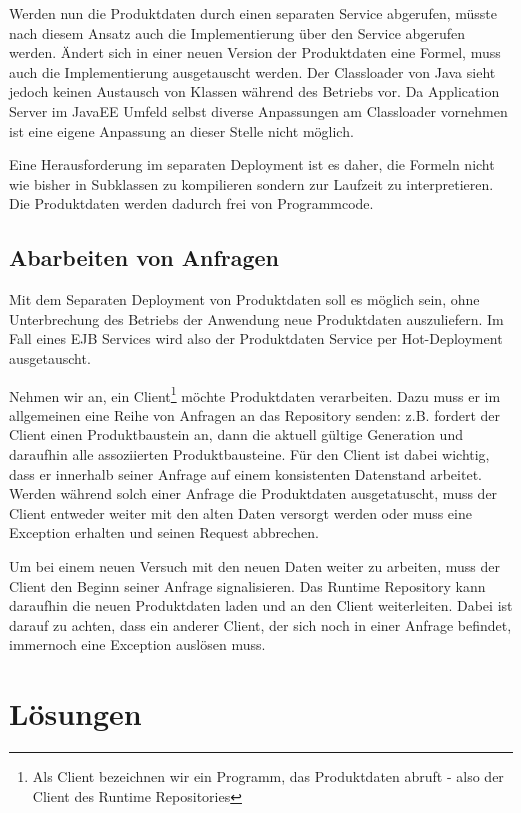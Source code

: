 \documentclass[headsepline=true, footsepline=true]{scrartcl}
\begin{document}
Werden nun die Produktdaten durch einen separaten Service abgerufen, müsste nach
diesem Ansatz auch die Implementierung über den Service abgerufen werden. Ändert
sich in einer neuen Version der Produktdaten eine Formel, muss auch die
Implementierung ausgetauscht werden. Der Classloader von Java sieht jedoch keinen
Austausch von Klassen während des Betriebs vor. Da Application Server im JavaEE
Umfeld selbst diverse Anpassungen am Classloader vornehmen ist eine eigene
Anpassung an dieser Stelle nicht möglich.

Eine Herausforderung im separaten Deployment ist es daher, die Formeln nicht wie
bisher in Subklassen zu kompilieren sondern zur Laufzeit zu interpretieren. Die
Produktdaten werden dadurch frei von Programmcode.

\subsection{Abarbeiten von Anfragen}
\label{requests}

Mit dem Separaten Deployment von Produktdaten soll es möglich sein, ohne
Unterbrechung des Betriebs der Anwendung neue Produktdaten auszuliefern. Im Fall
eines EJB Services wird also der Produktdaten Service per Hot-Deployment
ausgetauscht.

Nehmen wir an, ein Client\footnote{Als Client bezeichnen wir ein Programm, das
Produktdaten abruft - also der Client des Runtime Repositories} möchte
Produktdaten verarbeiten. Dazu muss er im allgemeinen eine Reihe von Anfragen an
das Repository senden: z.B. fordert der Client einen Produktbaustein an, dann die
aktuell gültige Generation und daraufhin alle assoziierten Produktbausteine. Für
den Client ist dabei wichtig, dass er innerhalb seiner Anfrage auf einem
konsistenten Datenstand arbeitet. Werden während solch einer Anfrage die
Produktdaten ausgetatuscht, muss der Client entweder weiter mit den alten Daten
versorgt werden oder muss eine Exception erhalten und seinen Request abbrechen.

Um bei einem neuen Versuch mit den neuen Daten weiter zu arbeiten, muss der
Client den Beginn seiner Anfrage signalisieren. Das Runtime Repository kann
daraufhin die neuen Produktdaten laden und an den Client weiterleiten. Dabei ist
darauf zu achten, dass ein anderer Client, der sich noch in einer Anfrage
befindet, immernoch eine Exception auslösen muss.

\section{Lösungen}
\end{document}
